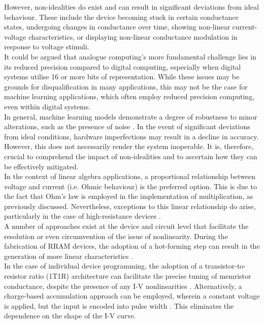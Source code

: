 \noindent However, non-idealities do exist and can result in significant deviations from ideal behaviour. These include the device becoming stuck in certain conductance states, undergoing changes in conductance over time, showing non-linear current-voltage characteristics, or displaying non-linear conductance modulation in response to voltage stimuli. \\

\noindent It could be argued that analogue computing's more fundamental challenge lies in its reduced precision compared to digital computing, especially when digital systems utilise 16 or more bits of representation. While these issues may be grounds for disqualification in many applications, this may not be the case for machine learning applications, which often employ reduced precision computing, even within digital systems. \\

\noindent In general, machine learning models demonstrate a degree of robustness to minor alterations, such as the presence of noise \cite{cheney2017robustness}. In the event of significant deviations from ideal conditions, hardware imperfections may result in a decline in accuracy. However, this does not necessarily render the system inoperable. It is, therefore, crucial to comprehend the impact of non-idealities and to ascertain how they can be effectively mitigated. \\

\noindent In the context of linear algebra applications, a proportional relationship between voltage and current (i.e. Ohmic behaviour) is the preferred option. This is due to the fact that Ohm's law is employed in the implementation of multiplication, as previously discussed. Nevertheless, exceptions to this linear relationship do arise, particularly in the case of high-resistance devices \cite{mehonic2017intrinsic}. \\

\noindent A number of approaches exist at the device and circuit level that facilitate the resolution or even circumvention of the issue of nonlinearity. During the fabrication of RRAM devices, the adoption of a hot-forming step can result in the generation of more linear characteristics \cite{sung2018effect}. \\

\noindent In the case of individual device programming, the adoption of a transistor-to-resistor ratio (1T1R) architecture can facilitate the precise tuning of memristor conductance, despite the presence of any I-V nonlinearities \cite{li2018analogue}. Alternatively, a charge-based accumulation approach can be employed, wherein a constant voltage is applied, but the input is encoded into pulse width \cite{amirsoleimani2020memory}. This eliminates the dependence on the shape of the I-V curve. \\

